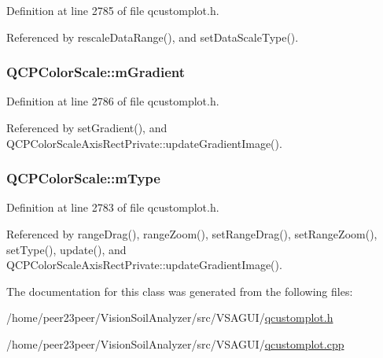 Definition at line 2785 of file qcustomplot.\+h.



Referenced by rescale\+Data\+Range(), and set\+Data\+Scale\+Type().

\hypertarget{class_q_c_p_color_scale_ae195a385032066b5c46cc3301af58922}{}
\subsubsection[{m\+Gradient}]{ Q\+C\+P\+Color\+Scale\+::m\+Gradient\hspace{0.3cm}{\ttfamily [protected]}}\label{class_q_c_p_color_scale_ae195a385032066b5c46cc3301af58922}


Definition at line 2786 of file qcustomplot.\+h.



Referenced by set\+Gradient(), and Q\+C\+P\+Color\+Scale\+Axis\+Rect\+Private\+::update\+Gradient\+Image().

\hypertarget{class_q_c_p_color_scale_a7d47ed4ab76f38e50164e9d77fe33789}{}
\subsubsection[{m\+Type}]{ Q\+C\+P\+Color\+Scale\+::m\+Type\hspace{0.3cm}{\ttfamily [protected]}}\label{class_q_c_p_color_scale_a7d47ed4ab76f38e50164e9d77fe33789}


Definition at line 2783 of file qcustomplot.\+h.



Referenced by range\+Drag(), range\+Zoom(), set\+Range\+Drag(), set\+Range\+Zoom(), set\+Type(), update(), and Q\+C\+P\+Color\+Scale\+Axis\+Rect\+Private\+::update\+Gradient\+Image().



The documentation for this class was generated from the following files\+:\begin{DoxyCompactItemize}
\item 
/home/peer23peer/\+Vision\+Soil\+Analyzer/src/\+V\+S\+A\+G\+U\+I/\hyperlink{qcustomplot_8h}{qcustomplot.\+h}\item 
/home/peer23peer/\+Vision\+Soil\+Analyzer/src/\+V\+S\+A\+G\+U\+I/\hyperlink{qcustomplot_8cpp}{qcustomplot.\+cpp}\end{DoxyCompactItemize}
